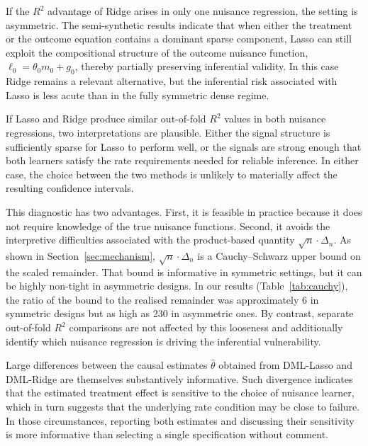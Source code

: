 \documentclass[a4paper,10.5pt]{article}
\begin{document}
If the $R^2$ advantage of Ridge arises in only one nuisance regression, the setting is asymmetric. The semi-synthetic results indicate that when either the treatment or the outcome equation contains a dominant sparse component, Lasso can still exploit the compositional structure of the outcome nuisance function, $\ell_0 = \theta_0 m_0 + g_0$, thereby partially preserving inferential validity. In this case Ridge remains a relevant alternative, but the inferential risk associated with Lasso is less acute than in the fully symmetric dense regime.

If Lasso and Ridge produce similar out-of-fold $R^2$ values in both nuisance regressions, two interpretations are plausible. Either the signal structure is sufficiently sparse for Lasso to perform well, or the signals are strong enough that both learners satisfy the rate requirements needed for reliable inference. In either case, the choice between the two methods is unlikely to materially affect the resulting confidence intervals.

This diagnostic has two advantages. First, it is feasible in practice because it does not require knowledge of the true nuisance functions. Second, it avoids the interpretive difficulties associated with the product-based quantity $\sqrt{n}\cdot\Delta_n$. As shown in Section~\ref{sec:mechanism}, $\sqrt{n}\cdot\Delta_n$ is a Cauchy--Schwarz upper bound on the scaled remainder. That bound is informative in symmetric settings, but it can be highly non-tight in asymmetric designs. In our results (Table~\ref{tab:cauchy}), the ratio of the bound to the realised remainder was approximately 6 in symmetric designs but as high as 230 in asymmetric ones. By contrast, separate out-of-fold $R^2$ comparisons are not affected by this looseness and additionally identify which nuisance regression is driving the inferential vulnerability.

Large differences between the causal estimates $\hat{\theta}$ obtained from DML-Lasso and DML-Ridge are themselves substantively informative. Such divergence indicates that the estimated treatment effect is sensitive to the choice of nuisance learner, which in turn suggests that the underlying rate condition may be close to failure. In those circumstances, reporting both estimates and discussing their sensitivity is more informative than selecting a single specification without comment.
\end{document}
